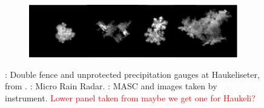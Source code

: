 \begin{figure}
\begin{subfigure}[b]{0.4\textwidth}
	\end{subfigure}	
	\begin{subfigure}[b]{0.4\textwidth}
		\includegraphics[width=\textwidth]{./fig_instruments/MASC_snowflakes.png}
		\caption{}\label{fig:MASC}
	\end{subfigure}	
	\caption{\protect{}: Double fence and unprotected precipitation gauges at Haukeliseter, from \cite{wolff_derivation_2015}. \protect{}: Micro Rain Radar. \protect{}: MASC and images taken by instrument. \textcolor{red}{Lower panel taken from \cite{cooper_variational_2017} maybe we get one for Haukeli?}}
	\vspace{-\normalbaselineskip}
\end{figure}
